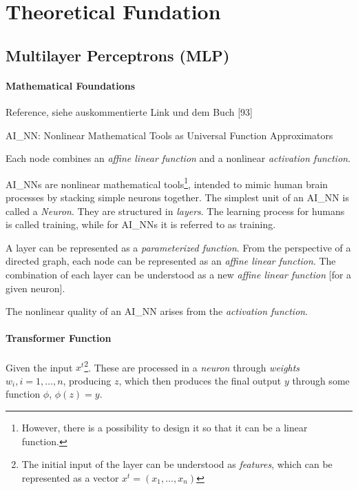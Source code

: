 \section{Theoretical Fundation}
\subsection{Multilayer Perceptrons (MLP)}

\paragraph{Mathematical Foundations}
Reference, siehe auskommentierte Link und dem Buch \cite{MLK_Andr_Buk}[93] %
\begin{description}
	\item \gls{AI_NN}: Nonlinear Mathematical Tools as Universal Function Approximators
	\item Each node combines an \textit{affine linear function} and a nonlinear \textit{activation function}. 
\end{description}

\glspl{AI_NN} are nonlinear mathematical tools\footnote{However, there is a possibility to design it so that it can be a linear function.}, intended to mimic human brain processes by stacking simple neurons together. The simplest unit of an \gls{AI_NN} is called a \textit{Neuron}. They are structured in \textit{layers}. The learning process for humans is called training, while for \glspl{AI_NN} it is referred to as training.

A layer can be represented as a \textit{parameterized function}. From the perspective of a directed graph, each node can be represented as an \textit{affine linear function}. The combination of each layer can be understood as a new \textit{affine linear function} [for a given neuron].

The nonlinear quality of an \gls{AI_NN} arises from the \textit{activation function}.

\paragraph{Transformer Function} Given the input $x^t$\footnote{
	The initial input of the layer can be understood as \textit{features}, which can be represented as a vector  $x^t = (x_1, \dots, x_n)$
}. These are processed in a \textit{neuron} through \textit{weights} $w_i, i=1,\dots, n$, producing $z$, which then produces the final output $y$ through some function $\phi$, $\phi(z) = y$.

